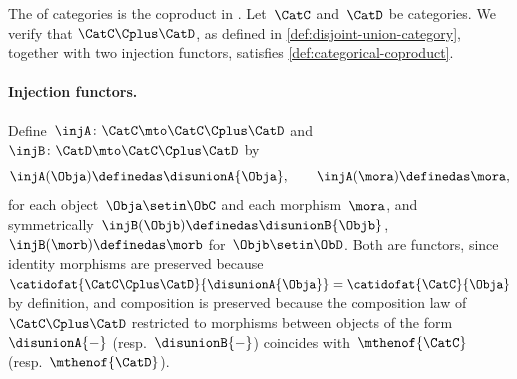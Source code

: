 \begin{example}
    The  of categories is the coproduct in \Category.
    Let~$\CatC$ and~$\CatD$ be categories.
    We verify that $\CatC \Cplus \CatD$, as defined in \cref{def:disjoint-union-category}, together with two injection functors, satisfies \cref{def:categorical-coproduct}.
    \paragraph{Injection functors.}
    Define~$\injA \colon \CatC \mto \CatC \Cplus \CatD$ and~$\injB \colon \CatD \mto \CatC \Cplus \CatD$ by
    \begin{equation}
        \injA(\Obja) \definedas \disunionA{\Obja},
        \qquad
        \injA(\mora) \definedas \mora,
    \end{equation}
    for each object~$\Obja \setin \ObC$ and each morphism~$\mora$, and symmetrically~$\injB(\Objb) \definedas \disunionB{\Objb}$,~$\injB(\morb) \definedas \morb$ for~$\Objb \setin \ObD$.
    Both are functors, since identity morphisms are preserved because~$\catidofat{\CatC \Cplus \CatD}{\disunionA{\Obja}} = \catidofat{\CatC}{\Obja}$ by definition, and composition is preserved because the composition law of~$\CatC \Cplus \CatD$ restricted to morphisms between objects of the form~$\disunionA{-}$ (resp.~$\disunionB{-}$) coincides with~$\mthenof{\CatC}$ (resp.~$\mthenof{\CatD}$).


\end{example}
